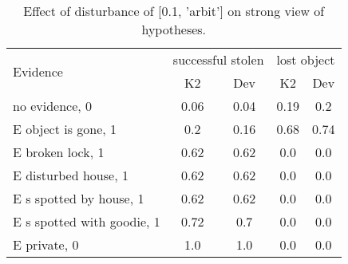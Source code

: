 \begin{table}\begin{tabular}{l|cc|cc}\toprule\multirow{2}{*}{Evidence} & \multicolumn{2}{c}{successful stolen}& \multicolumn{2}{c}{lost object}\\& {K2} & {Dev}& {K2} & {Dev}\\\midrule
no evidence, 0 & 0.06&0.04&0.19&0.2\\E object is gone, 1 & 0.2&0.16&\cellcolor{Bittersweet}0.68&\cellcolor{Bittersweet}0.74\\E broken lock, 1 & 0.62&0.62&0.0&0.0\\E disturbed house, 1 & 0.62&0.62&0.0&0.0\\E s spotted by house, 1 & 0.62&0.62&0.0&0.0\\E s spotted with goodie, 1 & 0.72&0.7&0.0&0.0\\E private, 0 & 1.0&1.0&0.0&0.0\\\bottomrule\end{tabular}\caption{Effect of disturbance of [0.1, 'arbit'] on strong view of hypotheses.}\end{table}